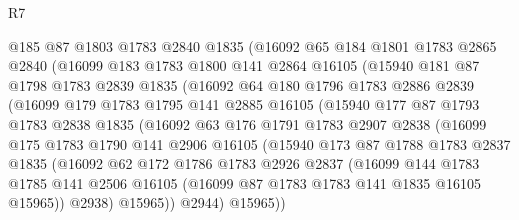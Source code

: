 \begin{lexlean}{R7}
\begin{coremodule}
            @185
            @87
            @1803
            @1783
            @2840
            @1835
            (@16092
              @65
              @184
              @1801
              @1783
              @2865
              @2840
              (@16099
                @183
                @1783
                @1800
                @141
                @2864
                @16105
                (@15940
                  @181
                  @87
                  @1798
                  @1783
                  @2839
                  @1835
                  (@16092
                    @64
                    @180
                    @1796
                    @1783
                    @2886
                    @2839
                    (@16099
                      @179
                      @1783
                      @1795
                      @141
                      @2885
                      @16105
                      (@15940
                        @177
                        @87
                        @1793
                        @1783
                        @2838
                        @1835
                        (@16092
                          @63
                          @176
                          @1791
                          @1783
                          @2907
                          @2838
                          (@16099
                            @175
                            @1783
                            @1790
                            @141
                            @2906
                            @16105
                            (@15940
                              @173
                              @87
                              @1788
                              @1783
                              @2837
                              @1835
                              (@16092
                                @62
                                @172
                                @1786
                                @1783
                                @2926
                                @2837
                                (@16099
                                  @144
                                  @1783
                                  @1785
                                  @141
                                  @2506
                                  @16105
                                  (@16099 @87 @1783 @1783 @141 @1835 @16105 @15965))
                                @2938)
                              @15965))
                          @2944)
                        @15965))

\end{coremodule}
\end{lexlean}
